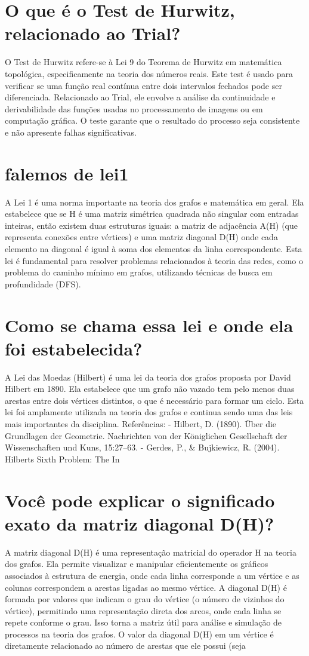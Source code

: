\documentclass[11pt,a4paper]{article}
\begin{document}
\section{O que é o Test de Hurwitz, relacionado ao Trial?}
O Test de Hurwitz refere-se à Lei 9 do Teorema de Hurwitz em matemática topológica, especificamente na teoria dos números reais. Este test é usado para verificar se uma função real contínua entre dois intervalos fechados pode ser diferenciada. Relacionado ao Trial, ele envolve a análise da continuidade e derivabilidade das funções usadas no processamento de imagens ou em computação gráfica. O teste garante que o resultado do processo seja consistente e não apresente falhas significativas.

\section{falemos de lei1}
A Lei 1 é uma norma importante na teoria dos grafos e matemática em geral. Ela estabelece que se H é uma matriz simétrica quadrada não singular com entradas inteiras, então existem duas estruturas iguais: a matriz de adjacência A(H) (que representa conexões entre vértices) e uma matriz diagonal D(H) onde cada elemento na diagonal é igual à soma dos elementos da linha correspondente. Esta lei é fundamental para resolver problemas relacionados à teoria das redes, como o problema do caminho mínimo em grafos, utilizando técnicas de busca em profundidade (DFS).

\section{Como se chama essa lei e onde ela foi estabelecida?}
A Lei das Moedas (Hilbert) é uma lei da teoria dos grafos proposta por David Hilbert em 1890. Ela estabelece que um grafo não vazado tem pelo menos duas arestas entre dois vértices distintos, o que é necessário para formar um ciclo. Esta lei foi amplamente utilizada na teoria dos grafos e continua sendo uma das leis mais importantes da disciplina. Referências: - Hilbert, D. (1890). Über die Grundlagen der Geometrie. Nachrichten von der Königlichen Gesellschaft der Wissenschaften und Kuns, 15:27–63. - Gerdes, P., \& Bujkiewicz, R. (2004). Hilberts Sixth Problem: The In

\section{Você pode explicar o significado exato da matriz diagonal D(H)?}
A matriz diagonal D(H) é uma representação matricial do operador H na teoria dos grafos. Ela permite visualizar e manipular eficientemente os gráficos associados à estrutura de energia, onde cada linha corresponde a um vértice e as colunas correspondem a arestas ligadas ao mesmo vértice. A diagonal D(H) é formada por valores que indicam o grau do vértice (o número de vizinhos do vértice), permitindo uma representação direta dos arcos, onde cada linha se repete conforme o grau. Isso torna a matriz útil para análise e simulação de processos na teoria dos grafos. O valor da diagonal D(H) em um vértice é diretamente relacionado ao número de arestas que ele possui (seja
\end{document}
